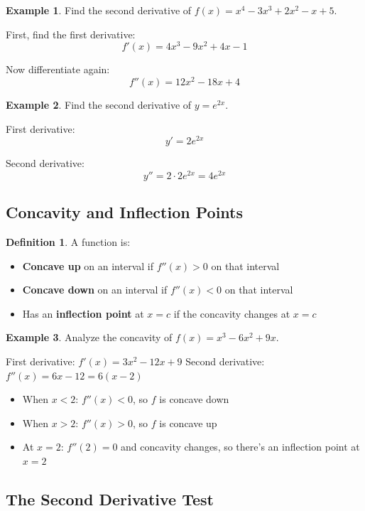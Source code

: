 \documentclass[12pt,a4paper]{book}
\theoremstyle{definition}
\newtheorem{definition}{Definition}[chapter]
\newtheorem{example}{Example}[chapter]
\begin{document}
\begin{example}
Find the second derivative of $f(x) = x^4 - 3x^3 + 2x^2 - x + 5$.

First, find the first derivative:
$$f'(x) = 4x^3 - 9x^2 + 4x - 1$$

Now differentiate again:
$$f''(x) = 12x^2 - 18x + 4$$
\end{example}

\begin{example}
Find the second derivative of $y = e^{2x}$.

First derivative:
$$y' = 2e^{2x}$$

Second derivative:
$$y'' = 2 \cdot 2e^{2x} = 4e^{2x}$$
\end{example}

\subsection{Concavity and Inflection Points}

\begin{definition}
A function is:
\begin{itemize}
    \item \textbf{Concave up} on an interval if $f''(x) > 0$ on that interval
    \item \textbf{Concave down} on an interval if $f''(x) < 0$ on that interval
    \item Has an \textbf{inflection point} at $x = c$ if the concavity changes at $x = c$
\end{itemize}
\end{definition}

\begin{example}
Analyze the concavity of $f(x) = x^3 - 6x^2 + 9x$.

First derivative: $f'(x) = 3x^2 - 12x + 9$
Second derivative: $f''(x) = 6x - 12 = 6(x - 2)$

\begin{itemize}
    \item When $x < 2$: $f''(x) < 0$, so $f$ is concave down
    \item When $x > 2$: $f''(x) > 0$, so $f$ is concave up
    \item At $x = 2$: $f''(2) = 0$ and concavity changes, so there's an inflection point at $x = 2$
\end{itemize}
\end{example}

\subsection{The Second Derivative Test}
\end{document}
